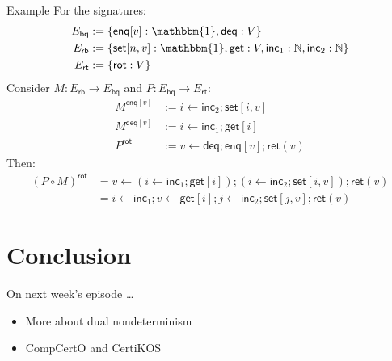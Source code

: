 \documentclass{beamer}
\begin{document}
\begin{frame}{Example}
For the signatures:
\begin{align*}
  E_\mathsf{bq} &:= \{ \mathsf{enq}[v] : \mathbbm{1}, \mathsf{deq} : V \} \\
  E_\mathsf{rb} &:= \{ \mathsf{set}[n,v] : \mathbbm{1},
                       \mathsf{get} : V,
                       \mathsf{inc}_1 : \mathbb{N},
                       \mathsf{inc}_2 : \mathbb{N} \} \\
  E_\mathsf{rt} &:= \{ \mathsf{rot} : V \}
\end{align*}
Consider $M : E_\mathsf{rb} \rightarrow E_\mathsf{bq}$
and $P : E_\mathsf{bq} \rightarrow E_\mathsf{rt}$:
\begin{align*}
  M^{\mathsf{enq}[v]} &:=
    i \leftarrow \mathsf{inc}_2 ; \mathsf{set}[i, v] \\
  M^{\mathsf{deq}[v]} &:=
    i \leftarrow \mathsf{inc}_1 ; \mathsf{get}[i] \\
  P^\mathsf{rot} &:= v \leftarrow \mathsf{deq} ;
    \mathsf{enq}[v] ; \mathsf{ret}(v)
\end{align*}
Then:
\begin{align*}
  (P \circ M)^\mathsf{rot} &=
    v \leftarrow (i \leftarrow \mathsf{inc}_1 ; \mathsf{get}[i]);
    (i \leftarrow \mathsf{inc}_2 ; \mathsf{set}[i, v]);
    \mathsf{ret}(v) \\
  &= i \leftarrow \mathsf{inc}_1 ; v \leftarrow \mathsf{get}[i] ;
     j \leftarrow \mathsf{inc}_2 ; \mathsf{set}[j, v] ;
     \mathsf{ret}(v)
\end{align*}
\end{frame}

\section{Conclusion}

\begin{frame}{On next week's episode \ldots}
\begin{itemize}
  \item More about dual nondeterminism
  \item CompCertO and CertiKOS
\end{itemize}
\end{frame}
\end{document}

